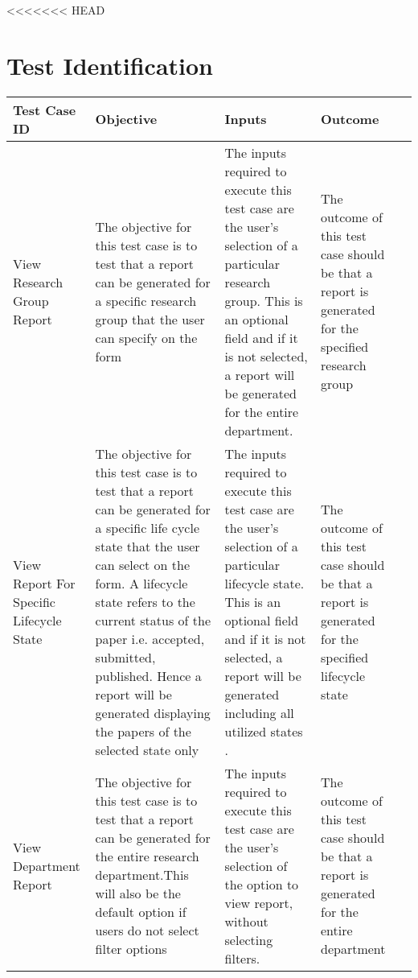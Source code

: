 <<<<<<< HEAD
\section{Test Identification} 
\label{sec:testId} 
\hypertarget{label}{}

\begin{tabular}{ L{3cm}| L{3cm}| L{3cm}| L{3cm}| L{0cm}} 
	\hline      
	\textbf{Test Case ID} & \textbf{Objective} & \textbf{Inputs} & \textbf{Outcome}\\
	\hline 
	\hline
	View Research Group Report  &  
	The objective for this test case is to test that a report can be generated for a specific research group that the user can specify on the form & 
	The inputs required to execute this test case are the user's selection of a particular research group. This is an optional field and if it is not selected, a report will be generated for the entire department. & 
	The outcome of this test case should be that a report is generated for the specified research group & \\
	\hline 
View Report For Specific Lifecycle State  &  
	The objective for this test case is to test that a report can be generated for a specific life cycle state that the user can select on the form. A lifecycle state refers to the current status of the paper i.e. accepted, submitted, published. Hence a report will be generated displaying the papers of the selected state only & 
	The inputs required to execute this test case are the user's selection of a particular lifecycle state. This is an optional field and if it is not selected, a report will be generated including all utilized states . & 
	The outcome of this test case should be that a report is generated for the specified lifecycle state & \\ 
	\hline 
View Department Report &  
	The objective for this test case is to test that a report can be generated for the entire research department.This will also be the default option if users do not select filter options & 
	The inputs required to execute this test case are the user's selection of the option to view report, without selecting filters. & 
	The outcome of this test case should be that a report is generated for the entire department& \\ 
\end{tabular}
\\

